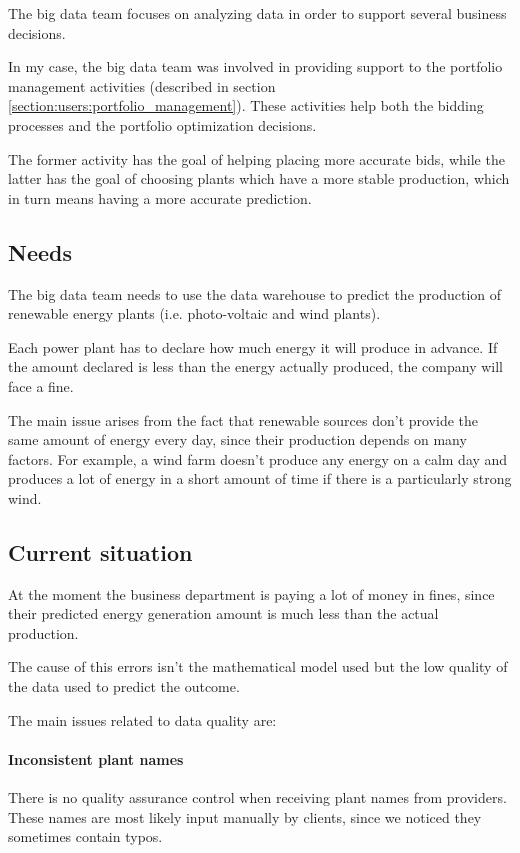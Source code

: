 The big data team focuses on analyzing data in order to support several business decisions.

In my case, the big data team was involved in providing support to the portfolio management activities (described in section \ref{section:users:portfolio_management}).
These activities help both the bidding processes and the portfolio optimization decisions.

The former activity has the goal of helping placing more accurate bids, while the latter has the goal of choosing plants which have a more stable production, which in turn means having a more accurate prediction.
    
\subsection{Needs}
    The big data team needs to use the data warehouse to predict the production of renewable energy plants (i.e. photo-voltaic and wind plants).
    
    Each power plant has to declare how much energy it will produce in advance.
    If the amount declared is less than the energy actually produced, the company will face a fine.
    
    The main issue arises from the fact that renewable sources don't provide the same amount of energy every day, since their production depends on many factors.
    For example, a wind farm doesn't produce any energy on a calm day and produces a lot of energy in a short amount of time if there is a particularly strong wind.
    
\subsection{Current situation}
    \reword At the moment the business department is paying a lot of money in fines, since their predicted energy generation amount is much less than the actual production.
    
    The cause of this errors isn't the mathematical model used but the low quality of the data used to predict the outcome.
    
    The main issues related to data quality are:
    \paragraph{Inconsistent plant names}
        There is no quality assurance control when receiving plant names from providers.
        These names are most likely input manually by clients, since we noticed they sometimes contain typos.
        
